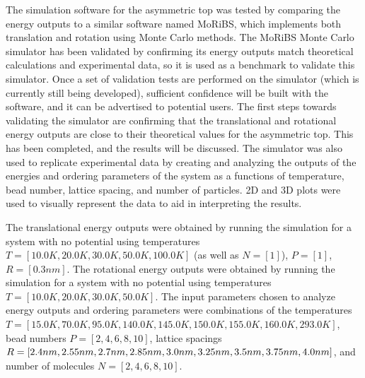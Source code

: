 \documentclass{ece}
\begin{document}
The simulation software for the asymmetric top was tested by comparing the energy outputs to a similar software named \gls{MoRiBS}, which implements both translation and rotation using Monte Carlo methods. The \gls{MoRiBS} Monte Carlo simulator has been validated by confirming its energy outputs match theoretical calculations and experimental data, so it is used as a benchmark to validate this simulator. Once a set of validation tests are performed on the simulator (which is currently still being developed), sufficient confidence will be built with the software, and it can be advertised to potential users. The first steps towards validating the simulator are confirming that the translational and rotational energy outputs are close to their theoretical values for the asymmetric top. This has been completed, and the results will be discussed. The simulator was also used to replicate experimental data by creating and analyzing the outputs of the energies and ordering parameters of the system as a functions of temperature, bead number, lattice spacing, and number of particles. 2D and 3D plots were used to visually represent the data to aid in interpreting the results.

The translational energy outputs were obtained by running the simulation for a system with no potential using temperatures \begin{math} T = [10.0 K, 20.0 K, 30.0 K, 50.0 K, 100.0 K] \end{math} (as well as \begin{math} N = [1] \end{math}), \begin{math} P = [1] \end{math}, \begin{math} R = [0.3 nm] \end{math}. The rotational energy outputs were obtained by running the simulation for a system with no potential using temperatures \begin{math} T = [10.0 K, 20.0 K, 30.0 K, 50.0 K] \end{math}. The input parameters chosen to analyze energy outputs and ordering parameters were combinations of the temperatures \begin{math} T = [15.0 K, 70.0 K, 95.0 K, 140.0 K, 145.0 K, 150.0 K, 155.0 K, 160.0 K, 293.0 K] \end{math}, bead numbers \begin{math} P = [2, 4, 6, 8, 10] \end{math}, lattice spacings \begin{math} R = [2.4 nm, 2.55 nm, 2.7 nm, 2.85 nm, 3.0 nm, 3.25 nm, 3.5 nm, 3.75 nm, \\ 4.0 nm]  \end{math}, and number of molecules \begin{math} N = [2, 4, 6, 8, 10] \end{math}.
\end{document}
